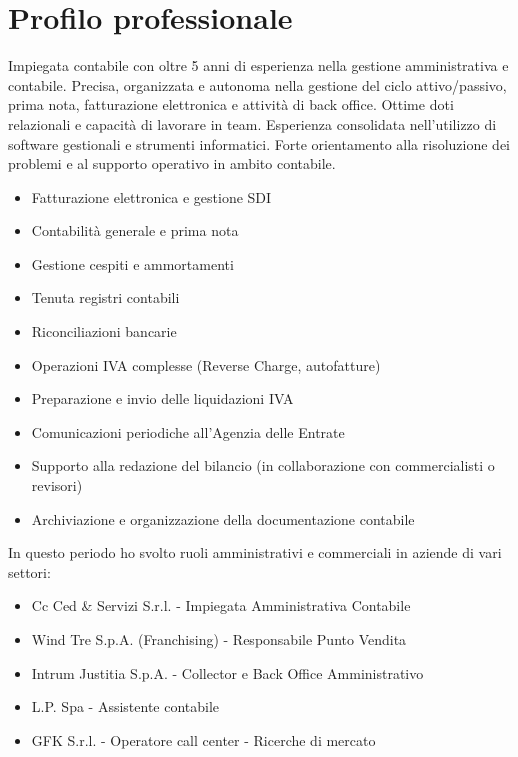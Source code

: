 \documentclass{resume}
\begin{document}



\section{\textbf{Profilo professionale}}
Impiegata contabile con oltre 5 anni di esperienza nella gestione amministrativa e contabile. Precisa,
organizzata e autonoma nella gestione del ciclo attivo/passivo, prima nota, fatturazione elettronica e attività di
back office. Ottime doti relazionali e capacità di lavorare in team. Esperienza consolidata nell'utilizzo di
software gestionali e strumenti informatici. Forte orientamento alla risoluzione dei problemi e al supporto
operativo in ambito contabile.

\begin{itemize}
  \item Fatturazione elettronica e gestione SDI
  \item Contabilità generale e prima nota
  \item Gestione cespiti e ammortamenti
  \item Tenuta registri contabili
  \item Riconciliazioni bancarie
  \item Operazioni IVA complesse (Reverse Charge, autofatture)
  \item Preparazione e invio delle liquidazioni IVA
  \item Comunicazioni periodiche all'Agenzia delle Entrate
  \item Supporto alla redazione del bilancio (in collaborazione con commercialisti o revisori)
  \item Archiviazione e organizzazione della documentazione contabile
\end{itemize}

In questo periodo ho svolto ruoli amministrativi e commerciali in aziende di vari settori:
\begin{itemize}
  \item Cc Ced \& Servizi S.r.l. - Impiegata Amministrativa Contabile
  \item Wind Tre S.p.A. (Franchising) - Responsabile Punto Vendita
  \item Intrum Justitia S.p.A. - Collector e Back Office Amministrativo
  \item L.P. Spa - Assistente contabile
  \item GFK S.r.l. - Operatore call center - Ricerche di mercato
\end{itemize}
\end{document}
